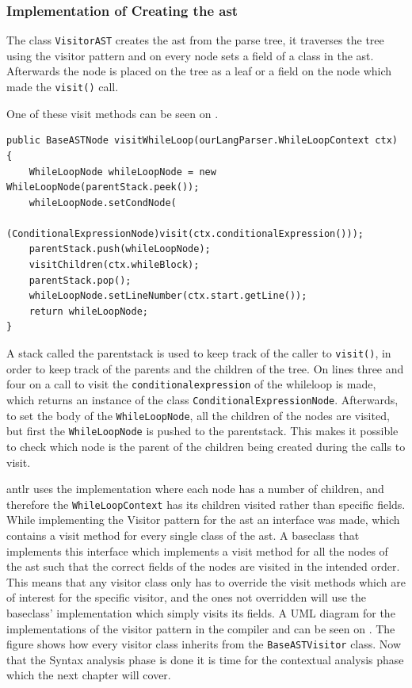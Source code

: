 \subsubsection*{Implementation of Creating the \acrshort{ast}}

The class \texttt{VisitorAST} creates the \acrshort{ast} from the parse tree, it traverses the tree using the visitor pattern and on every node sets a field of a class in the \acrshort{ast}. 
Afterwards the node is placed on the tree as a leaf or a field on the node which made the \texttt{visit()} call.

One of these visit methods can be seen on .

\begin{lstlisting}[caption=The visit method for WhileLoopNode,frame=tlrb,label={lst:VisitorASTCode}]
public BaseASTNode visitWhileLoop(ourLangParser.WhileLoopContext ctx) {
    WhileLoopNode whileLoopNode = new WhileLoopNode(parentStack.peek());
    whileLoopNode.setCondNode(
    	(ConditionalExpressionNode)visit(ctx.conditionalExpression()));
    parentStack.push(whileLoopNode);
    visitChildren(ctx.whileBlock);
    parentStack.pop();
    whileLoopNode.setLineNumber(ctx.start.getLine());
    return whileLoopNode;
}
\end{lstlisting}
A stack called the parentstack is used to keep track of the caller to \texttt{visit()}, in order to keep track of the parents and the children of the tree.
On lines three and four on  a call to visit the \texttt{conditionalexpression} of the whileloop is made, which returns an instance of the class \texttt{ConditionalExpressionNode}.
Afterwards, to set the body of the \texttt{WhileLoopNode}, all the children of the nodes are visited, but first the \texttt{WhileLoopNode} is pushed to the parentstack.
This makes it possible to check which node is the parent of the children being created during the calls to visit.

\acrshort{antlr} uses the implementation where each node has a number of children, and therefore the \texttt{WhileLoopContext} has its children visited rather than specific fields.
While implementing the Visitor pattern for the \acrshort{ast} an interface was made, which contains a visit method for every single class of the \acrshort{ast}.
A baseclass that implements this interface which implements a visit method for all the nodes of the \acrshort{ast} such that the correct fields of the nodes are visited in the intended order.
This means that any visitor class only has to override the visit methods which are of interest for the specific visitor, and the ones not overridden will use the baseclass' implementation which simply visits its fields.
A UML diagram for the implementations of the visitor pattern in the compiler and can be seen on .
The figure shows how every visitor class inherits from the \texttt{BaseASTVisitor} class.
Now that the Syntax analysis phase is done it is time for the contextual analysis phase which the next chapter will cover.

